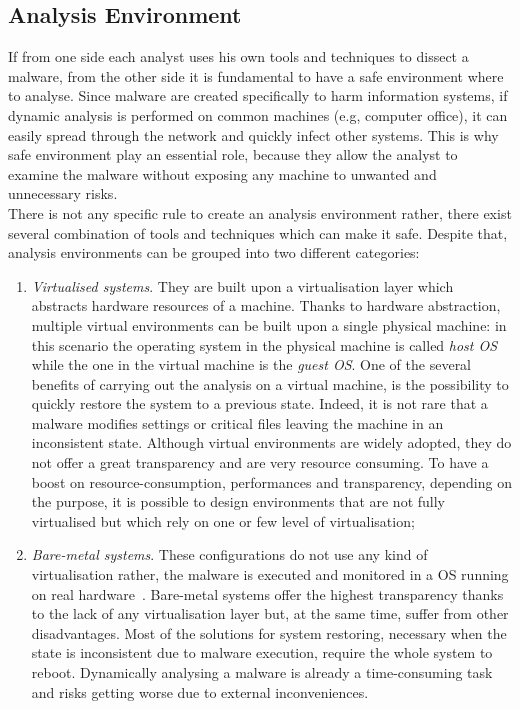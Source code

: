 \documentclass[LaM,binding=0.6cm]{sapthesis}
\begin{document}
\subsection{Analysis Environment}
\label{subsec:analysisenvironment}
If from one side each analyst uses his own tools and techniques to dissect a malware, from the other side it is fundamental to have a safe environment where to analyse. Since malware are created specifically to harm information systems, if dynamic analysis is performed on common machines (e.g, computer office), it can easily spread through the network and quickly infect other systems. This is why safe environment play an essential role, because they allow the analyst to examine the malware without exposing any machine to unwanted and unnecessary risks.\\
There is not any specific rule to create an analysis environment rather, there exist several combination of tools and techniques which can make it safe. Despite that, analysis environments can be grouped into two different categories:
\begin{enumerate}
\item \textit{Virtualised systems}. They are built upon a virtualisation layer which abstracts hardware resources of a machine. Thanks to hardware abstraction, multiple virtual environments can be built upon a single physical machine: in this scenario the operating system in the physical machine is called \textit{host OS} while the one in the virtual machine is the \textit{guest OS}. One of the several benefits of carrying out the analysis on a virtual machine, is the possibility to quickly restore the system to a previous state. Indeed, it is not rare that a malware modifies settings or critical files leaving the machine in an inconsistent state. Although virtual environments are widely adopted, they do not offer a great transparency and are very resource consuming. To have a boost on resource-consumption, performances and transparency, depending on the purpose, it is possible to design environments that are not fully virtualised but which rely on one or few level of virtualisation;
\item \textit{Bare-metal systems}. These configurations do not use any kind of virtualisation rather, the malware is executed and monitored in a OS running on real hardware~\cite{kirat2011barebox}. Bare-metal systems offer the highest transparency thanks to the lack of any virtualisation layer but, at the same time, suffer from other disadvantages. Most of the solutions for system restoring, necessary when the state is inconsistent due to malware execution, require the whole system to reboot. Dynamically analysing a malware is already a time-consuming task and risks getting worse due to external inconveniences.
\end{enumerate}
\end{document}
